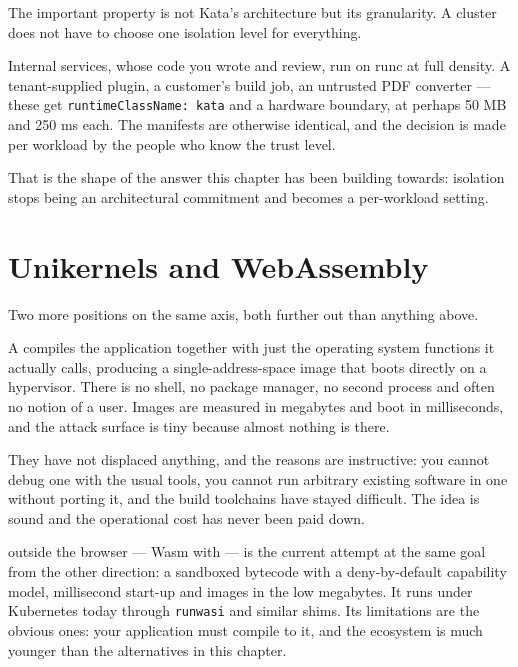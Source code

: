 \begin{conceptbox}
The important property is not Kata's architecture but its granularity. A
cluster does not have to choose one isolation level for everything.

\smallskip
Internal services, whose code you wrote and review, run on runc at full density.
A tenant-supplied plugin, a customer's build job, an untrusted PDF converter
--- these get \texttt{runtimeClassName: kata} and a hardware boundary, at
perhaps 50 MB and 250 ms each. The manifests are otherwise identical, and the
decision is made per workload by the people who know the trust level.

\smallskip
That is the shape of the answer this chapter has been building towards:
isolation stops being an architectural commitment and becomes a per-workload
setting.
\end{conceptbox}

\section{Unikernels and WebAssembly}

Two more positions on the same axis, both further out than anything above.

A  compiles the application together with just the operating
system functions it actually calls, producing a single-address-space image that
boots directly on a hypervisor. There is no shell, no package manager, no
second process and often no notion of a user. Images are measured in megabytes
and boot in milliseconds, and the attack surface is tiny because almost nothing
is there.

They have not displaced anything, and the reasons are instructive: you cannot
debug one with the usual tools, you cannot run arbitrary existing software in
one without porting it, and the build toolchains have stayed difficult. The
idea is sound and the operational cost has never been paid down.

 outside the browser --- Wasm with  --- is the
current attempt at the same goal from the other direction: a sandboxed
bytecode with a deny-by-default capability model, millisecond start-up and
images in the low megabytes. It runs under Kubernetes today through
\texttt{runwasi} and similar shims. Its limitations are the obvious ones: your
application must compile to it, and the ecosystem is much younger than the
alternatives in this chapter.

